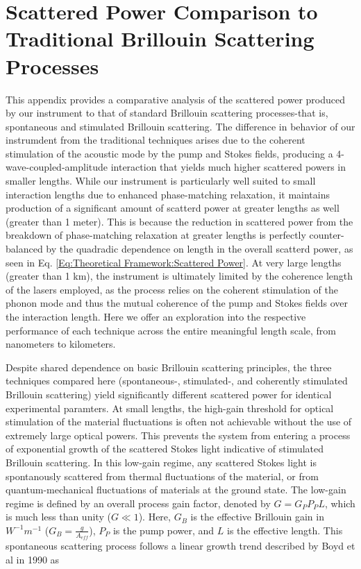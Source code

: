 \newpage


\section{Scattered Power Comparison to Traditional Brillouin Scattering Processes}

This appendix provides a comparative analysis of the scattered power produced by our instrument to that of standard Brillouin scattering processes-that is, spontaneous and stimulated Brillouin scattering. The difference in behavior of our instrumdent from the traditional techniques arises due to the coherent stimulation of the acoustic mode by the pump and Stokes fields, producing a 4-wave-coupled-amplitude interaction that yields much higher scattered powers in smaller lengths. While our instrument is particularly well suited to small interaction lengths due to enhanced phase-matching relaxation, it maintains production of a significant amount of scatterd power at greater lengths as well (greater than 1 meter). This is because the reduction in scattered power from the breakdown of phase-matching relaxation at greater lengths is perfectly counter-balanced by the quadradic dependence on length in the overall scatterd power, as seen in Eq. \ref{Eq:Theoretical Framework:Scattered Power}. At very large lengths (greater than 1 km), the instrument is ultimately limited by the coherence length of the lasers employed, as the process relies on the coherent stimulation of the phonon mode and thus the mutual coherence of the pump and Stokes fields over the interaction length. Here we offer an exploration into the respective performance of each technique across the entire meaningful length scale, from nanometers to kilometers.

Despite shared dependence on basic Brillouin scattering principles, the three techniques compared here (spontaneous-, stimulated-, and coherently stimulated Brillouin scattering) yield significantly different scattered power for identical experimental paramters. At small lengths, the high-gain threshold for optical stimulation of the material fluctuations is often not achievable without the use of extremely large optical powers. This prevents the system from entering a process of exponential growth of the scattered Stokes light indicative of stimulated Brillouin scattering.\cite{boyd2020nonlinear} In this low-gain regime, any scattered Stokes light is spontanously scattered from thermal fluctuations of the material, or from quantum-mechanical fluctuations of materials at the ground state. The low-gain regime is defined by an overall process gain factor, denoted by $G = G_{P}P_{P}L$, which is much less than unity ($G \ll 1$). Here, $G_{B}$ is the effective Brillouin gain in $W^{-1}m^{-1}$ ($G_{B} = \frac{g}{A_{eff}}$), $P_{P}$ is the pump power, and $L$ is the effective length. This spontaneous scattering process follows a linear growth trend described by Boyd et al in 1990\cite{boyd1990noise} as

